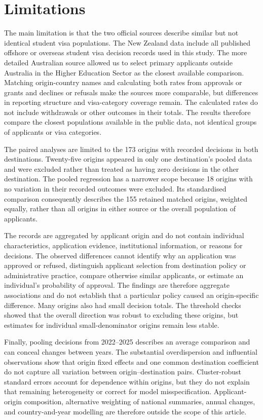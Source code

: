 \documentclass[runningheads]{llncs}
\begin{document}
\section{Limitations}

The main limitation is that the two official sources describe similar but not identical student visa populations. The New Zealand data include all published offshore or overseas student visa decision records used in this study. The more detailed Australian source allowed us to select primary applicants outside Australia in the Higher Education Sector as the closest available comparison. Matching origin-country names and calculating both rates from approvals or grants and declines or refusals make the sources more comparable, but differences in reporting structure and visa-category coverage remain. The calculated rates do not include withdrawals or other outcomes in their totals. The results therefore compare the closest populations available in the public data, not identical groups of applicants or visa categories.

The paired analyses are limited to the 173 origins with recorded decisions in both destinations. Twenty-five origins appeared in only one destination's pooled data and were excluded rather than treated as having zero decisions in the other destination. The pooled regression has a narrower scope because 18 origins with no variation in their recorded outcomes were excluded. Its standardised comparison consequently describes the 155 retained matched origins, weighted equally, rather than all origins in either source or the overall population of applicants.

The records are aggregated by applicant origin and do not contain individual characteristics, application evidence, institutional information, or reasons for decisions. The observed differences cannot identify why an application was approved or refused, distinguish applicant selection from destination policy or administrative practice, compare otherwise similar applicants, or estimate an individual's probability of approval. The findings are therefore aggregate associations and do not establish that a particular policy caused an origin-specific difference. Many origins also had small decision totals. The threshold checks showed that the overall direction was robust to excluding these origins, but estimates for individual small-denominator origins remain less stable.

Finally, pooling decisions from 2022--2025 describes an average comparison and can conceal changes between years. The substantial overdispersion and influential observations show that origin fixed effects and one common destination coefficient do not capture all variation between origin--destination pairs. Cluster-robust standard errors account for dependence within origins, but they do not explain that remaining heterogeneity or correct for model misspecification. Applicant-origin composition, alternative weighting of national summaries, annual changes, and country-and-year modelling are therefore outside the scope of this article.
\end{document}
